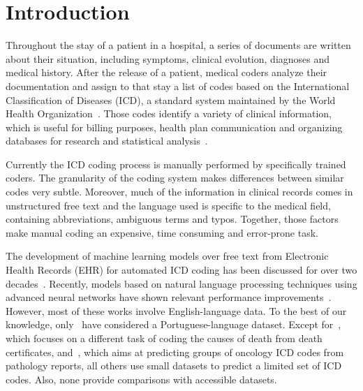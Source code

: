\documentclass[runningheads]{llncs}
\begin{document}
\section{Introduction}

Throughout the stay of a patient in a hospital, a series of documents are written about their situation, including symptoms, clinical evolution, diagnoses and medical history. After the release of a patient, medical coders analyze their documentation and assign to that stay a list of codes based on the International Classification of Diseases (ICD), a standard system maintained by the World Health Organization~\cite{organizationInternationalClassificationDiseases1978,organizationICD10InternationalStatistical2004}. Those codes identify a variety of clinical information, which is useful for billing purposes, health plan communication and organizing databases for research and statistical analysis~\cite{jensenMiningElectronicHealth2012a}.

Currently the ICD coding process is manually performed by specifically trained coders. The granularity of the coding system makes differences between similar codes very subtle. Moreover, much of the information in clinical records comes in unstructured free text and the language used is specific to the medical field, containing abbreviations, ambiguous terms and typos. Together, those factors make manual coding an expensive, time consuming and error-prone task.

The development of machine learning models over free text from Electronic Health Records (EHR) for automated ICD coding has been discussed for over two decades~\cite{larkeyAutomaticAssignmentICD91995}. Recently, models based on natural language processing techniques using advanced neural networks have shown relevant performance improvements~\cite{mullenbachExplainablePredictionMedical2018,liICDCodingClinical2019}. However, most of these works involve English-language data. To the best of our knowledge, only~\cite{delimaHierarchicalApproachAutomatic1998,ferraoUsingStructuredEHR2013a,oleynikAutomated2017,santosUsingDeepConvolutional2018,duarteDeepNeuralModels2018} have considered a Portuguese-language dataset. Except for~\cite{duarteDeepNeuralModels2018}, which focuses on a different task of coding the causes of death from death certificates, and~\cite{oleynikAutomated2017}, which aims at predicting groups of oncology ICD codes from pathology reports, all others use small datasets to predict a limited set of ICD codes. Also, none provide comparisons with accessible datasets.
\end{document}
